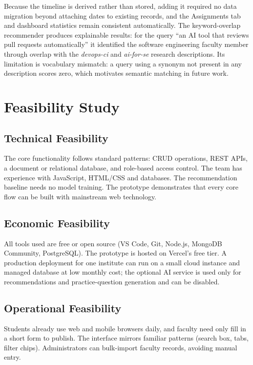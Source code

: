 \documentclass[conference]{IEEEtran}
\begin{document}
Because the timeline is derived rather than stored, adding it required no data migration beyond attaching dates to existing records, and the Assignments tab and dashboard statistics remain consistent automatically. The keyword-overlap recommender produces explainable results: for the query ``an AI tool that reviews pull requests automatically'' it identified the software engineering faculty member through overlap with the \emph{devops-ci} and \emph{ai-for-se} research descriptions. Its limitation is vocabulary mismatch: a query using a synonym not present in any description scores zero, which motivates semantic matching in future work.

\section{Feasibility Study}

\subsection{Technical Feasibility}
The core functionality follows standard patterns: CRUD operations, REST APIs, a document or relational database, and role-based access control. The team has experience with JavaScript, HTML/CSS and databases. The recommendation baseline needs no model training. The prototype demonstrates that every core flow can be built with mainstream web technology.

\subsection{Economic Feasibility}
All tools used are free or open source (VS Code, Git, Node.js, MongoDB Community, PostgreSQL). The prototype is hosted on Vercel's free tier. A production deployment for one institute can run on a small cloud instance and managed database at low monthly cost; the optional AI service is used only for recommendations and practice-question generation and can be disabled.

\subsection{Operational Feasibility}
Students already use web and mobile browsers daily, and faculty need only fill in a short form to publish. The interface mirrors familiar patterns (search box, tabs, filter chips). Administrators can bulk-import faculty records, avoiding manual entry.
\end{document}
